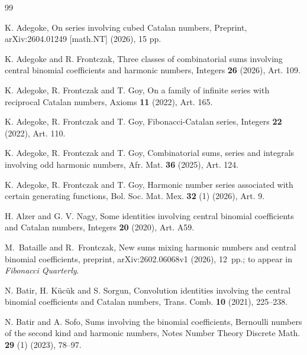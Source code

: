 \documentclass[12pt,reqno]{article}
\begin{document}
\begin{thebibliography}{99}

K. Adegoke, On series involving cubed Catalan numbers, 
Preprint, arXiv:2604.01249 [math.NT] (2026), 15 pp.


\vspace{-1pt}
K. Adegoke and R. Frontczak, Three classes of combinatorial sums involving central binomial coefficients and harmonic numbers, 
Integers \textbf{26} (2026), Art. 109.

\vspace{-1pt}
K. Adegoke, R. Frontczak and T. Goy, On a family of infinite series with reciprocal Catalan numbers, Axioms \textbf{11} (2022), Art. 165.

\vspace{-1pt}
K. Adegoke, R. Frontczak and T. Goy, Fibonacci-Catalan series, Integers \textbf{22} (2022), Art. 110.

\vspace{-1pt}
K. Adegoke, R. Frontczak and T. Goy, Combinatorial sums, series and integrals involving odd harmonic numbers, Afr. Mat. \textbf{36} (2025), Art. 124.

\vspace{-1pt}
K. Adegoke, R. Frontczak and T. Goy, Harmonic number series associated with certain generating functions, Bol. Soc. Mat. Mex. 
\textbf{32} (1) (2026), Art. 9.

\vspace{-1pt}
H. Alzer and G. V. Nagy, Some identities involving central binomial coefficients and Catalan numbers, Integers \textbf{20} (2020), Art. A59.

\vspace{-1pt}
M.~Bataille and R.~Frontczak, New sums mixing harmonic numbers and central
binomial coefficients, preprint, arXiv:2602.06068v1 (2026), 12~pp.;
to appear in \textit{Fibonacci Quarterly}.

\vspace{-1pt}
N. Batir, H. K\"uc\"uk and S. Sorgun, Convolution identities involving the central binomial coefficients and Catalan numbers, 
Trans. Comb. \textbf{10} (2021), 225--238.

\vspace{-1pt} 
N. Batir and A. Sofo, Sums involving the binomial coefficients, Bernoulli numbers of the second kind and harmonic numbers, Notes Number Theory Discrete Math. {\bf 29} (1) (2023), 78--97.


\end{thebibliography}
\end{document}
